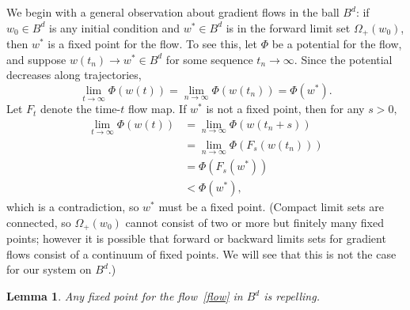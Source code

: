\documentclass[%
 aip,
 amsmath,amssymb,
 reprint,%
]{revtex4-1}
\newtheorem{lemma}[theorem]{Lemma}
\begin{document}
We begin with a general observation about gradient flows in the ball $B^d$: if $w_0 \in B^d$ is any initial condition and $w^\ast \in B^d$ is in the forward limit set $\Omega_+(w_0)$, then $w^\ast$ is a fixed point for the flow.  To see this, let $\Phi$ be a potential for the flow, and suppose $w(t_n) \to w^\ast \in B^d$ for some sequence $t_n \to \infty$. 
Since the potential decreases along trajectories,
$$
\lim_{t \to \infty} \Phi(w(t)) = \lim_{n \to \infty} \Phi(w(t_n)) = \Phi(w^\ast).
$$
Let $F_t$ denote the time-$t$ flow map. If $w^\ast$ is not a fixed point, then for any $s > 0,$
\begin{align*}
\lim_{t \to \infty} \Phi(w(t)) &= \lim_{n \to \infty} \Phi(w(t_n+s)) \\
&= \lim_{n \to \infty} \Phi(F_s ( w(t_n))) 
\\&= \Phi(F_s(w^\ast)) \\ &< \Phi(w^\ast),
\end{align*}
which is a contradiction, so $w^\ast$ must be a fixed point.   (Compact limit sets are connected, so $\Omega_+(w_0)$ cannot consist of two or more but finitely many fixed points; however it is possible that forward or backward limits sets for gradient flows consist of a continuum of fixed points.  We will see that this is not the case for our system on $B^d$.)

\begin{lemma}
Any fixed point for the flow~\eqref{flow} in $B^d$ is repelling.
\end{lemma}
\end{document}
